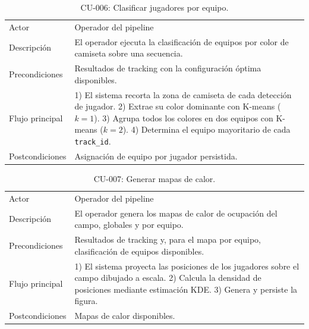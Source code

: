 \begin{table}[htp]
\centering
\caption{CU-006: Clasificar jugadores por equipo.}
\label{tab:cu-006}
\renewcommand{\arraystretch}{1.2}
\begin{tabular}{|p{3.1cm}|p{9.2cm}|}
\hline
\rowcolor{gray!25}
\multicolumn{2}{|l|}{\textbf{CU-006 -- Clasificar jugadores por equipo}} \\
\hline
Actor & Operador del pipeline \\
\hline
Descripción & El operador ejecuta la clasificación de equipos por color de
  camiseta sobre una secuencia. \\
\hline
Precondiciones & Resultados de tracking con la configuración óptima
 disponibles. \\
\hline
Flujo principal & 1) El sistema recorta la zona de camiseta de cada
  detección de jugador. 2) Extrae su color dominante con K-means ($k=1$).
  3) Agrupa todos los colores en dos equipos con K-means ($k=2$). 4)
  Determina el equipo mayoritario de cada \texttt{track\_id}. \\
\hline
Postcondiciones & Asignación de equipo por jugador persistida. \\
\hline
\end{tabular}
\end{table}

\begin{table}[htp]
\centering
\caption{CU-007: Generar mapas de calor.}
\label{tab:cu-007}
\renewcommand{\arraystretch}{1.2}
\begin{tabular}{|p{3.1cm}|p{9.2cm}|}
\hline
\rowcolor{gray!25}
\multicolumn{2}{|l|}{\textbf{CU-007 -- Generar mapas de calor}} \\
\hline
Actor & Operador del pipeline \\
\hline
Descripción & El operador genera los mapas de calor de ocupación del
  campo, globales y por equipo. \\
\hline
Precondiciones & Resultados de tracking y, para el mapa por
  equipo, clasificación de equipos disponibles. \\
\hline
Flujo principal & 1) El sistema proyecta las posiciones de los jugadores
  sobre el campo dibujado a escala. 2) Calcula la densidad de posiciones
  mediante estimación KDE. 3) Genera y persiste la figura. \\
\hline
Postcondiciones & Mapas de calor disponibles. \\
\hline
\end{tabular}
\end{table}

